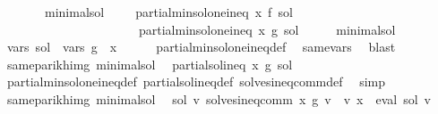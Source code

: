 \begin{isabellebody}
\ \ \ \ \ \ \ minimal{\isacharunderscore}{\kern0pt}sol{\isacharcolon}{\kern0pt}\ \ \ \ \ {\isachardoublequoteopen}partial{\isacharunderscore}{\kern0pt}min{\isacharunderscore}{\kern0pt}sol{\isacharunderscore}{\kern0pt}one{\isacharunderscore}{\kern0pt}ineq\ x\ f\ sol{\isachardoublequoteclose}\isanewline
\ \ \ \ \ \ \ \ \ \ \ \ \ \ \ \ \ \ \ \ \ \ {\isachardoublequoteopen}partial{\isacharunderscore}{\kern0pt}min{\isacharunderscore}{\kern0pt}sol{\isacharunderscore}{\kern0pt}one{\isacharunderscore}{\kern0pt}ineq\ x\ g\ sol{\isachardoublequoteclose}\isanewline
%
\isadelimproof
%
\endisadelimproof
%
\isatagproof
{}\isamarkupfalse%
\ {\isacharminus}{\kern0pt}\isanewline
\ \ \isamarkupfalse%
\ minimal{\isacharunderscore}{\kern0pt}sol\ \isamarkupfalse%
\ {\isachardoublequoteopen}vars\ sol\ {\isasymsubseteq}\ vars\ g\ {\isacharminus}{\kern0pt}\ {\isacharbraceleft}{\kern0pt}x{\isacharbraceright}{\kern0pt}{\isachardoublequoteclose}\isanewline
\ \ \ \ \isamarkupfalse%
\ partial{\isacharunderscore}{\kern0pt}min{\isacharunderscore}{\kern0pt}sol{\isacharunderscore}{\kern0pt}one{\isacharunderscore}{\kern0pt}ineq{\isacharunderscore}{\kern0pt}def\ \isamarkupfalse%
\ same{\isacharunderscore}{\kern0pt}vars\ \isamarkupfalse%
\ blast\isanewline
\ \ \isamarkupfalse%
\ \isamarkupfalse%
\ same{\isacharunderscore}{\kern0pt}parikh{\isacharunderscore}{\kern0pt}img\ minimal{\isacharunderscore}{\kern0pt}sol\ \isamarkupfalse%
\ {\isachardoublequoteopen}partial{\isacharunderscore}{\kern0pt}sol{\isacharunderscore}{\kern0pt}ineq\ x\ g\ sol{\isachardoublequoteclose}\isanewline
\ \ \ \ \isamarkupfalse%
\ partial{\isacharunderscore}{\kern0pt}min{\isacharunderscore}{\kern0pt}sol{\isacharunderscore}{\kern0pt}one{\isacharunderscore}{\kern0pt}ineq{\isacharunderscore}{\kern0pt}def\ partial{\isacharunderscore}{\kern0pt}sol{\isacharunderscore}{\kern0pt}ineq{\isacharunderscore}{\kern0pt}def\ solves{\isacharunderscore}{\kern0pt}ineq{\isacharunderscore}{\kern0pt}comm{\isacharunderscore}{\kern0pt}def\ \isamarkupfalse%
\ simp\isanewline
\ \ \isamarkupfalse%
\ \isamarkupfalse%
\ same{\isacharunderscore}{\kern0pt}parikh{\isacharunderscore}{\kern0pt}img\ minimal{\isacharunderscore}{\kern0pt}sol\ \isamarkupfalse%
\ {\isachardoublequoteopen}{\isasymforall}sol{\isacharprime}{\kern0pt}\ v{\isacharprime}{\kern0pt}{\isachardot}{\kern0pt}\ solves{\isacharunderscore}{\kern0pt}ineq{\isacharunderscore}{\kern0pt}comm\ x\ g\ v{\isacharprime}{\kern0pt}\ {\isasymand}\ v{\isacharprime}{\kern0pt}\ x\ {\isacharequal}{\kern0pt}\ eval\ sol{\isacharprime}{\kern0pt}\ v{\isacharprime}{\kern0pt}\isanewline

\end{isabellebody}
